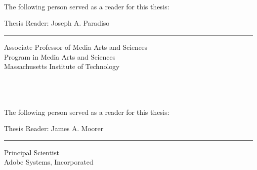 
\clearpage
{}
\begin{fullwidth}
\mbox{ }\\
\mbox{ }\\
\mbox{ }\\ 
\vfill
\noindent The following person served as a reader for this thesis:\\
\vspace{10mm}

\noindent Thesis Reader: \hfill Joseph A. Paradiso\vspace{3pt}\hrule\vspace{6pt}
\flushright Associate Professor of Media Arts and Sciences\\
\flushright Program in Media Arts and Sciences\\
\flushright Massachusetts Institute of Technology\\

\thispagestyle{empty}  %
\end{fullwidth}
 
\clearpage 
{}
\begin{fullwidth}
\mbox{ }\\
\mbox{ }\\
\mbox{ }\\ 
\vfill
\noindent The following person served as a reader for this thesis:\\
\vspace{10mm}

\noindent Thesis Reader: \hfill James A. Moorer\vspace{3pt}\hrule\vspace{6pt}
\flushright Principal Scientist\\
\flushright Adobe Systems, Incorporated\\
\thispagestyle{empty}  %
\end{fullwidth}
 


